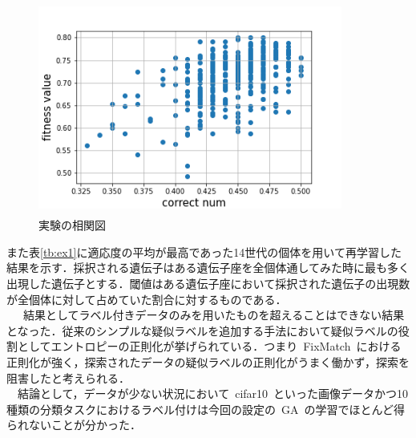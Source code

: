 \documentclass[twocolumn]{jarticle}     %
\begin{document}
\begin{figure}[h]
	\begin{center}
		\vspace*{-3mm}
		\hspace*{-8mm}
		\includegraphics[height=70mm,width=100mm]{img.png}
		\caption{実験の相関図\label{fig:ex1_1}}
	\end{center}
\end{figure}

また表\ref{tb:ex1}に適応度の平均が最高であった14世代の個体を用いて再学習した結果を示す．採択される遺伝子はある遺伝子座を全個体通してみた時に最も多く出現した遺伝子とする．閾値はある遺伝子座において採択された遺伝子の出現数が全個体に対して占めていた割合に対するものである．\\
\ \ \ 結果としてラベル付きデータのみを用いたものを超えることはできない結果となった．従来のシンプルな疑似ラベルを追加する手法\cite{lee2013pseudo}において疑似ラベルの役割としてエントロピーの正則化が挙げられている．つまり\ FixMatch\ における正則化が強く，探索されたデータの疑似ラベルの正則化がうまく働かず，探索を阻害したと考えられる．\\
\ \ 結論として，データが少ない状況において\ cifar10\ といった画像データかつ10種類の分類タスクにおけるラベル付けは今回の設定の\ GA\ の学習でほとんど得られないことが分かった．

\begin{table}[h]
	\centering
	\caption{GA\ の設定\label{tb:ex1}}
\end{table}
\end{document}
